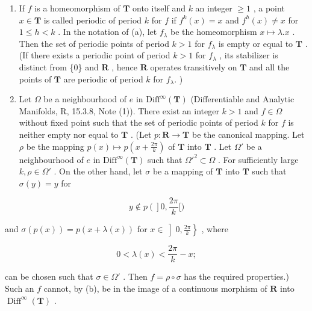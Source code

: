 \begin{enumerate}
\def\labelenumi{(\alph{enumi})}
\setcounter{enumi}{1}
\item
  If \(f\) is a homeomorphism of \(\mathbf{T}\) onto itself and \(k\) an integer \(\geqslant 1\) , a point \(x \in \mathbf{T}\) is called periodic of period \(k\) for \(f\) if \(f^k(x) = x\) and \(f^h(x) \neq x\) for \(1 \leqslant h < k\) . In the notation of (a), let \(f_{\lambda}\) be the homeomorphism \(x \mapsto \lambda .x\) . Then the set of periodic points of period \(k > 1\) for \(f_{\lambda}\) is empty or equal to \(\mathbf{T}\) . (If there exists a periodic point of period \(k > 1\) for \(f_{\lambda}\) , its stabilizer is distinct from \{0\} and \(\mathbf{R}\) , hence \(\mathbf{R}\) operates transitively on \(\mathbf{T}\) and all the points of \(\mathbf{T}\) are periodic of period \(k\) for \(f_{\lambda}.\) )
\item
  Let \(\Omega\) be a neighbourhood of \(e\) in \(\mathrm{Diff}^{\infty}(\mathbf{T})\) (Differentiable and Analytic Manifolds, R, 15.3.8, Note (1)). There exist an integer \(k > 1\) and \(f\in \Omega\) without fixed point such that the set of periodic points of period \(k\) for \(f\) is neither empty nor equal to \(\mathbf{T}\) . (Let \(p\colon \mathbf{R}\to \mathbf{T}\) be the canonical mapping. Let \(\rho\) be the mapping \(p(x) \mapsto p\left(x + \frac{2\pi}{k}\right)\) of \(\mathbf{T}\) into \(\mathbf{T}\) . Let \(\Omega'\) be a neighbourhood of \(e\) in \(\text{Diff}^\infty(\mathbf{T})\) such that \(\Omega'^2 \subset \Omega\) . For sufficiently large \(k, \rho \in \Omega'\) . On the other hand, let \(\sigma\) be a mapping of \(\mathbf{T}\) into \(\mathbf{T}\) such that \(\sigma(y) = y\) for
\end{enumerate}

\[
y \notin p \left(\right] 0, \frac {2 \pi}{k} [)
\]

and \(\sigma(p(x)) = p(x + \lambda(x))\) for \(x \in \left]0, \frac{2\pi}{k}\right\}\) , where

\[
0 <   \lambda (x) <   \frac {2 \pi}{k} - x;
\]

can be chosen such that \(\sigma \in \Omega'\) . Then \(f = \rho \circ \sigma\) has the required properties.) Such an \(f\) cannot, by (b), be in the image of a continuous morphism of \(\mathbf{R}\) into \(\operatorname{Diff}^{\infty}(\mathbf{T})\) .

